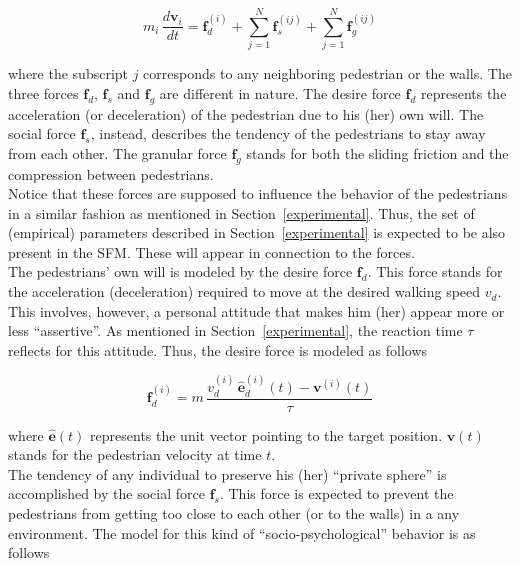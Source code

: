 \documentclass[preprint,12pt]{elsarticle}
\begin{document}
\begin{equation}
 m_i\,\displaystyle\frac{d\mathbf{v}_i}{dt}=\mathbf{f}_d^{(i)}+
 \displaystyle\sum_{j=1}^N\mathbf{f}_s^{(ij)}+
 \displaystyle\sum_{j=1}^N\mathbf{f}_g^{(ij)}\label{eqn_motion}
\end{equation}

\noindent where the subscript $j$ corresponds to any neighboring pedestrian or 
the walls. The three forces $\mathbf{f}_d$, $\mathbf{f}_s$ and $\mathbf{f}_g$ 
are different in nature. The desire force $\mathbf{f}_d$ represents the 
acceleration (or deceleration) of the pedestrian due to his (her) own will. 
The social force $\mathbf{f}_s$, instead, describes the tendency of the 
pedestrians to stay away from each other. The granular force $\mathbf{f}_g$ 
stands for both the sliding friction and the compression between 
pedestrians. \\

Notice that these forces are supposed to influence the behavior of the 
pedestrians in a similar fashion as mentioned in Section~\ref{experimental}. 
Thus, the set of (empirical) parameters described in Section~\ref{experimental} 
is expected to be also present in the SFM. These will appear in connection to 
the forces. \\   

The pedestrians' own will is modeled by the desire force $\mathbf{f}_d$. 
This force stands for the acceleration (deceleration) required to move
 at the desired walking speed $v_d$. This involves, however, a 
personal attitude that makes him (her) appear more or less ``assertive''. As 
mentioned in Section~\ref{experimental}, the reaction time $\tau$ reflects for 
this attitude. Thus, the desire force is modeled as follows

\begin{equation}
\mathbf{f}_d^{(i)}=m\,\displaystyle\frac{v_d^{(i)}\,
\hat{\mathbf{e}}_d^{(i)}(t)-
 \mathbf{v}^{(i)}(t)}{\tau}
\end{equation}


\noindent where $\hat{\mathbf{e}}(t)$ represents the unit vector pointing to 
the target position. $\mathbf{v}(t)$ stands for the pedestrian velocity at time 
$t$. \\

The tendency of any individual to preserve his (her) ``private sphere'' is 
accomplished by the social force $\mathbf{f}_s$. This force is expected to 
prevent the pedestrians from getting too close to each other (or to the walls) 
in a any environment. The model for this kind of 
``socio-psychological'' behavior is as follows
\end{document}
